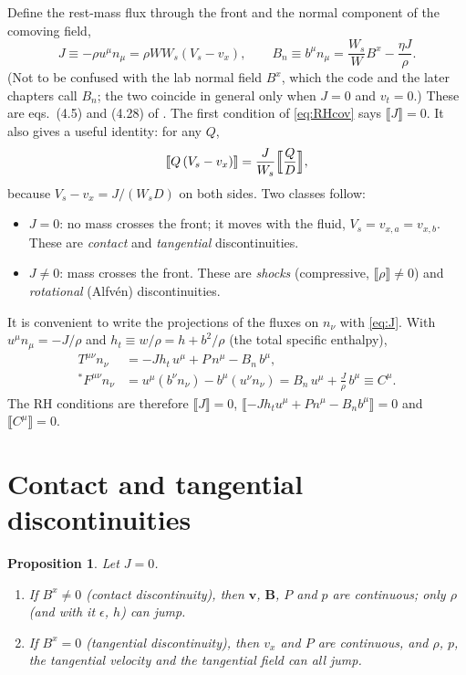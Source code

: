 \documentclass[11pt,a4paper,oneside,openany]{book}
\newcommand{\textcite}{\citet}
\theoremstyle{definition}
\theoremstyle{plain}
\newtheorem{proposition}{Proposition}[chapter]
\theoremstyle{remark}
\newcommand{\jump}[1]{\llbracket #1\rrbracket}
\newcommand{\vv}{\bm{v}}
\newcommand{\BB}{\bm{B}}
\newcommand{\Ptot}{P}
\newcommand{\vB}{\eta}
\begin{document}
Define the rest-mass flux through the front and the normal component of the comoving
field,
\begin{equation}\label{eq:J}
J\equiv-\rho u^\mu n_\mu=\rho WW_s(V_s-v_x),\qquad
B_n\equiv b^\mu n_\mu=\frac{W_s}{W}B^x-\frac{\vB J}{\rho}.
\end{equation}
(Not to be confused with the lab normal field $B^x$, which the code and the later chapters
call $B_n$; the two coincide in general only when $J=0$ and $v_t=0$.)
These are eqs.~(4.5) and (4.28) of \textcite{GiacomazzoRezzolla2006}. The first condition
of \eqref{eq:RHcov} says $\jump{J}=0$. It also gives a useful identity: for any $Q$,
\begin{equation}\label{eq:jumpidentity}
\jump{Q\,(V_s-v_x)}=\frac{J}{W_s}\Bigl\llbracket\frac{Q}{D}\Bigr\rrbracket ,
\end{equation}
because $V_s-v_x=J/(W_sD)$ on both sides. Two classes follow:
\begin{itemize}[nosep]
\item $J=0$: no mass crosses the front; it moves with the fluid, $V_s=v_{x,a}=v_{x,b}$.
  These are \emph{contact} and \emph{tangential} discontinuities.
\item $J\neq0$: mass crosses the front. These are \emph{shocks} (compressive,
  $\jump{\rho}\ne0$) and \emph{rotational} (Alfvén) discontinuities.
\end{itemize}

It is convenient to write the projections of the fluxes on $n_\nu$ with \eqref{eq:J}.
With $u^\mu n_\mu=-J/\rho$ and $h_t\equiv w/\rho=h+b^2/\rho$ (the total specific
enthalpy),
\begin{align}
T^{\mu\nu}n_\nu&=-Jh_t\,u^\mu+\Ptot\,n^\mu-B_n\,b^\mu, \label{eq:Tn}\\
{}^\ast\!F^{\mu\nu}n_\nu&=u^\mu(b^\nu n_\nu)-b^\mu(u^\nu n_\nu)=B_n\,u^\mu+\frac{J}{\rho}\,b^\mu
\equiv C^\mu. \label{eq:Cmu}
\end{align}
The RH conditions are therefore $\jump{J}=0$, $\jump{-Jh_tu^\mu+\Ptot n^\mu-B_nb^\mu}=0$
and $\jump{C^\mu}=0$.

\section{Contact and tangential discontinuities}

\begin{proposition}\label{prop:contact}
Let $J=0$.
\begin{enumerate}[label=(\alph*),nosep]
\item If $B^x\ne0$ (contact discontinuity), then $\vv$, $\BB$, $\Ptot$ and $p$ are
  continuous; only $\rho$ (and with it $\epsilon$, $h$) can jump.
\item If $B^x=0$ (tangential discontinuity), then $v_x$ and $\Ptot$ are continuous, and
  $\rho$, $p$, the tangential velocity and the tangential field can all jump.
\end{enumerate}
\end{proposition}
\end{document}
